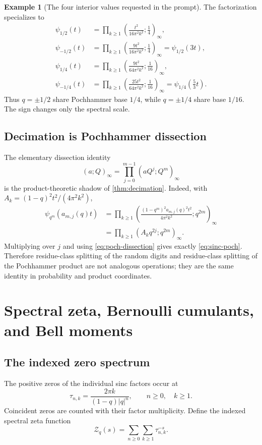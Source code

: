 \documentclass[11pt,oneside]{article}
\theoremstyle{definition}
\newtheorem{example}[theorem]{Example}
\theoremstyle{remark}
\begin{document}
\begin{example}[The four interior values requested in the prompt]
The factorization specializes to
\begin{align}
 \psi_{1/2}(t)
 &=\prod_{k\ge1}\left(\frac{t^2}{16\pi^2k^2};\frac14\right)_\infty,
 \label{eq:poch-half}\\
 \psi_{-1/2}(t)
 &=\prod_{k\ge1}\left(\frac{9t^2}{16\pi^2k^2};\frac14\right)_\infty
 =\psi_{1/2}(3t),\label{eq:poch-minus-half}\\
 \psi_{1/4}(t)
 &=\prod_{k\ge1}\left(\frac{9t^2}{64\pi^2k^2};\frac1{16}\right)_\infty,
 \label{eq:poch-quarter}\\
 \psi_{-1/4}(t)
 &=\prod_{k\ge1}\left(\frac{25t^2}{64\pi^2k^2};\frac1{16}\right)_\infty
 =\psi_{1/4}\!\left(\frac53t\right).
 \label{eq:poch-minus-quarter}
\end{align}
Thus \(q=\pm1/2\) share Pochhammer base \(1/4\), while \(q=\pm1/4\) share
base \(1/16\).  The sign changes only the spectral scale.
\end{example}

\subsection{Decimation is Pochhammer dissection}
The elementary dissection identity
\begin{equation}\label{eq:poch-dissection}
 (a;Q)_\infty=\prod_{j=0}^{m-1}(aQ^j;Q^m)_\infty
\end{equation}
is the product-theoretic shadow of \cref{thm:decimation}.
Indeed, with
\(A_k=(1-q)^2t^2/(4\pi^2k^2)\),
\begin{align*}
 \psi_{q^m}(a_{m,j}(q)t)
 &=\prod_{k\ge1}
 \left(
 \frac{(1-q^m)^2a_{m,j}(q)^2t^2}{4\pi^2k^2};q^{2m}
 \right)_\infty\\
 &=\prod_{k\ge1}(A_kq^{2j};q^{2m})_\infty.
\end{align*}
Multiplying over \(j\) and using \eqref{eq:poch-dissection} gives exactly
\eqref{eq:sinc-poch}.  Therefore residue-class splitting of the random digits
and residue-class splitting of the Pochhammer product are not analogous
operations; they are the same identity in probability and product coordinates.

\section{Spectral zeta, Bernoulli cumulants, and Bell moments}\label{sec:cumulants}

\subsection{The indexed zero spectrum}
The positive zeros of the individual sinc factors occur at
\begin{equation}\label{eq:zeros}
 \tau_{n,k}=\frac{2\pi k}{(1-q)|q|^n},
 \qquad n\ge0,\quad k\ge1.
\end{equation}
Coincident zeros are counted with their factor multiplicity.  Define the
indexed spectral zeta function
\[
 \mathcal Z_q(s)=\sum_{n\ge0}\sum_{k\ge1}\tau_{n,k}^{-s}.
\]
\end{document}
